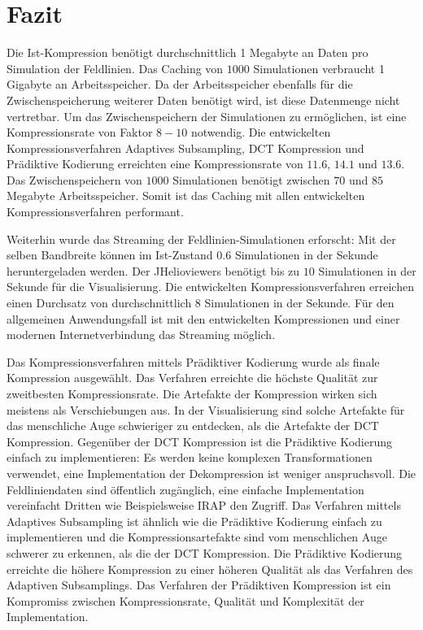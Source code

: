 \section{Fazit}
Die Ist-Kompression benötigt durchschnittlich 1 Megabyte an Daten pro Simulation der Feldlinien. Das Caching von $1000$ Simulationen verbraucht 1 Gigabyte an Arbeitsspeicher. Da der Arbeitsspeicher ebenfalls für die Zwischenspeicherung weiterer Daten benötigt wird, ist diese Datenmenge nicht vertretbar. Um das Zwischenspeichern der Simulationen zu ermöglichen, ist eine Kompressionsrate von Faktor $8-10$ notwendig. Die entwickelten Kompressionsverfahren Adaptives Subsampling, DCT Kompression und Prädiktive Kodierung erreichten eine Kompressionsrate von $11.6$, $14.1$ und $13.6$. Das Zwischenspeichern von $1000$ Simulationen benötigt zwischen $70$ und $85$ Megabyte Arbeitsspeicher. Somit ist das Caching mit allen entwickelten Kompressionsverfahren performant.

Weiterhin wurde das Streaming der Feldlinien-Simulationen erforscht: Mit der selben Bandbreite können im Ist-Zustand $0.6$ Simulationen in der Sekunde heruntergeladen werden. Der JHelioviewers benötigt bis zu $10$ Simulationen in der Sekunde für die Visualisierung. Die entwickelten Kompressionsverfahren erreichen einen Durchsatz von durchschnittlich $8$ Simulationen in der Sekunde. Für den allgemeinen Anwendungsfall ist mit den entwickelten Kompressionen und einer modernen Internetverbindung das Streaming möglich.

Das Kompressionsverfahren mittels Prädiktiver Kodierung wurde als finale Kompression ausgewählt. Das Verfahren erreichte die höchste Qualität zur zweitbesten Kompressionsrate. Die Artefakte der Kompression wirken sich meistens als Verschiebungen aus. In der Visualisierung sind solche Artefakte für das menschliche Auge schwieriger zu entdecken, als die Artefakte der DCT Kompression. Gegenüber der DCT Kompression ist die Prädiktive Kodierung einfach zu implementieren: Es werden keine komplexen Transformationen verwendet, eine Implementation der Dekompression ist weniger anspruchsvoll. Die Feldliniendaten sind öffentlich zugänglich, eine einfache Implementation vereinfacht Dritten wie Beispielsweise IRAP \cite{website:irap} den Zugriff. Das Verfahren mittels Adaptives Subsampling ist ähnlich wie die Prädiktive Kodierung einfach zu implementieren und die Kompressionsartefakte sind vom menschlichen Auge schwerer zu erkennen, als die der DCT Kompression. Die Prädiktive Kodierung erreichte die höhere Kompression zu einer höheren Qualität als das Verfahren des Adaptiven Subsamplings. Das Verfahren der Prädiktiven Kompression ist ein Kompromiss zwischen Kompressionsrate, Qualität und Komplexität der Implementation.

